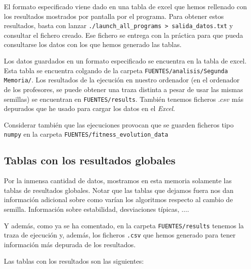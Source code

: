 \documentclass[11pt]{article}
\begin{document}
El formato especificado viene dado en una tabla de excel que hemos rellenado con los resultados mostrados por pantalla por el programa. Para obtener estos resultados, basta con lanzar \lstinline{./launch_all_programs > salida_datos.txt} y consultar el fichero creado. Ese fichero se entrega con la práctica para que pueda consultarse los datos con los que hemos generado las tablas.

Los datos guardados en un formato especificado se encuentra en la tabla de excel. Esta tabla se encuentra colgando de la carpeta \lstinline{FUENTES/analisis/Segunda Memoria/}. Los resultados de la ejecución en nuestro ordenador (en el ordenador de los profesores, se puede obtener una traza distinta a pesar de usar las mismas semillas) se encuentran en \lstinline{FUENTES/results}. También tenemos ficheros $.csv$ más depurados que he usado para cargar los datos en el \emph{Excel}.

Considerar también que las ejecuciones provocan que se guarden ficheros tipo \lstinline{numpy} en la carpeta \lstinline{FUENTES/fitness_evolution_data}

\subsection{Tablas con los resultados globales}

Por la inmensa cantidad de datos, mostramos en esta memoria solamente las tablas de resultados globales. Notar que las tablas que dejamos fuera nos dan información adicional sobre como varían los algoritmos respecto al cambio de semilla. Información sobre estabilidad, desviaciones típicas, $\ldots$.

Y además, como ya se ha comentado, en la carpeta \lstinline{FUENTES/results} tenemos la traza de ejecución y, además, los ficheros \lstinline{.csv} que hemos generado para tener información más depurada de los resultados.

Las tablas con los resultados son las siguientes:


\end{document}
